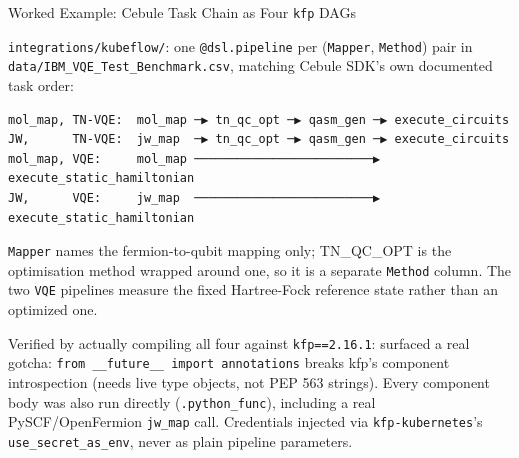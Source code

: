 \documentclass[
  ignorenonframetext,
  aspectratio=169,
]{beamer}
\begin{document}
\begin{frame}[fragile]{Worked Example: Cebule Task Chain as Four
\texttt{kfp} DAGs}
\label{worked-example-cebule-task-chain-as-four-kfp-dags}
\footnotesize

\texttt{integrations/kubeflow/}: one \texttt{@dsl.pipeline} per
(\texttt{Mapper}, \texttt{Method}) pair in
\texttt{data/IBM\_VQE\_Test\_Benchmark.csv}, matching Cebule SDK's own
documented task order:

\begin{verbatim}
mol_map, TN-VQE:  mol_map ─▶ tn_qc_opt ─▶ qasm_gen ─▶ execute_circuits
JW,      TN-VQE:  jw_map  ─▶ tn_qc_opt ─▶ qasm_gen ─▶ execute_circuits
mol_map, VQE:     mol_map ─────────────────────────▶ execute_static_hamiltonian
JW,      VQE:     jw_map  ─────────────────────────▶ execute_static_hamiltonian
\end{verbatim}

\texttt{Mapper} names the fermion-to-qubit mapping only; TN\_QC\_OPT is
the optimisation method wrapped around one, so it is a separate
\texttt{Method} column. The two \texttt{VQE} pipelines measure the fixed
Hartree-Fock reference state rather than an optimized one.

Verified by actually compiling all four against \texttt{kfp==2.16.1}:
surfaced a real gotcha:
\texttt{from\ \_\_future\_\_\ import\ annotations} breaks kfp's
component introspection (needs live type objects, not PEP 563 strings).
Every component body was also run directly (\texttt{.python\_func}),
including a real PySCF/OpenFermion \texttt{jw\_map} call. Credentials
injected via \texttt{kfp-kubernetes}'s \texttt{use\_secret\_as\_env},
never as plain pipeline parameters. \normalsize
\end{frame}
\end{document}
